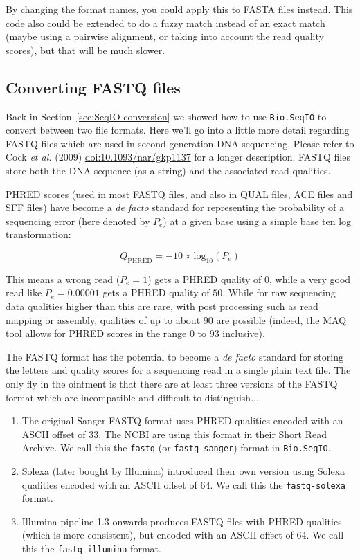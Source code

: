 \documentclass{report}
\begin{document}
By changing the format names, you could apply this to FASTA files instead.
This code also could be extended to do a fuzzy match instead of an exact
match (maybe using a pairwise alignment, or taking into account the read
quality scores), but that will be much slower.

\subsection{Converting FASTQ files}
\label{sec:SeqIO-fastq-conversion}

Back in Section~\ref{sec:SeqIO-conversion} we showed how to use
\verb|Bio.SeqIO| to convert between two file formats. Here we'll go into a
little more detail regarding FASTQ files which are used in second generation
DNA sequencing. Please refer to Cock \textit{et al.} (2009)
\href{http://dx.doi.org/10.1093/nar/gkp1137}{doi:10.1093/nar/gkp1137} for
a longer description. FASTQ files store both the DNA sequence (as a string)
and the associated read qualities. 

PHRED scores (used in most FASTQ files, and also in QUAL files, ACE files
and SFF files) have become a \textit{de facto} standard for representing
the probability of a sequencing error (here denoted by $P_e$) at a given
base using a simple base ten log transformation:

\begin{equation}
Q_{\textrm{PHRED}} = - 10 \times \textrm{log}_{10} ( P_e )
\end{equation}

This means a wrong read ($P_e = 1$) gets a PHRED quality of $0$, while a very
good read like $P_e = 0.00001$ gets a PHRED quality of $50$. While for raw
sequencing data qualities higher than this are rare, with post processing
such as read mapping or assembly, qualities of up to about $90$ are possible
(indeed, the MAQ tool allows for PHRED scores in the range 0 to 93 inclusive).

The FASTQ format has the potential to become a \textit{de facto} standard for
storing the letters and quality scores for a sequencing read in a single plain
text file. The only fly in the ointment is that there are at least three
versions of the FASTQ format which are incompatible and difficult to
distinguish...

\begin{enumerate}
\item The original Sanger FASTQ format uses PHRED qualities encoded with an
ASCII offset of 33. The NCBI are using this format in their Short Read
Archive. We call this the \texttt{fastq} (or \texttt{fastq-sanger}) format
in \verb|Bio.SeqIO|.
\item Solexa (later bought by Illumina) introduced their own version using
Solexa qualities encoded with an ASCII offset of 64. We call this the
\texttt{fastq-solexa} format.
\item Illumina pipeline 1.3 onwards produces FASTQ files with PHRED qualities
(which is more consistent), but encoded with an ASCII offset of 64. We call
this the \texttt{fastq-illumina} format.
\end{enumerate}
\end{document}
